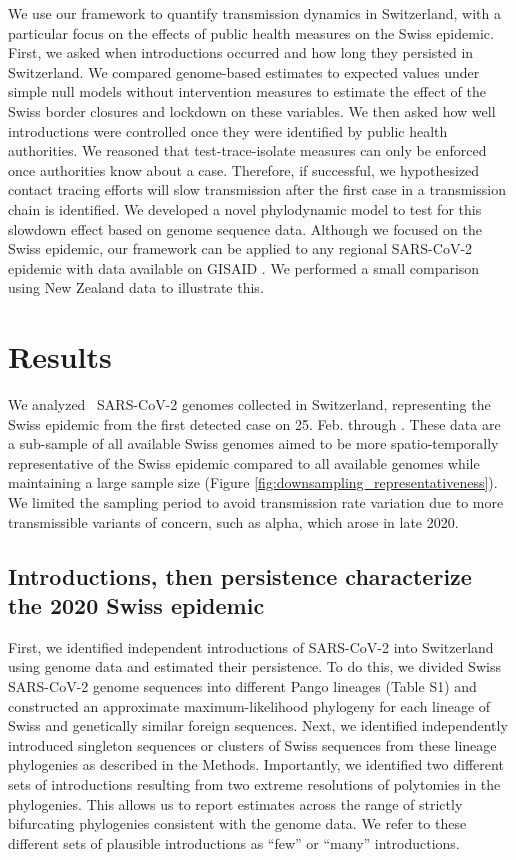 \documentclass[11pt,twoside,lineno]{pnas-new} %
\begin{document}
We use our framework to quantify transmission dynamics in Switzerland, with a particular focus on the effects of public health measures on the Swiss epidemic. First, we asked when introductions occurred and how long they persisted in Switzerland. We compared genome-based estimates to expected values under simple null models without intervention measures to estimate the effect of the Swiss border closures and lockdown on these variables. We then asked how well introductions were controlled once they were identified by public health authorities. We reasoned that test-trace-isolate measures can only be enforced once authorities know about a case. Therefore, if successful, we hypothesized contact tracing efforts will slow transmission after the first case in a transmission chain is identified. We developed a novel phylodynamic model to test for this slowdown effect based on genome sequence data. Although we focused on the Swiss epidemic, our framework can be applied to any regional SARS-CoV-2 epidemic with data available on GISAID \cite{GISAID}. We performed a small comparison using New Zealand data to illustrate this. 

\section{Results}
We analyzed \nfocalsamples\ SARS-CoV-2 genomes collected in Switzerland, representing the Swiss epidemic from the first detected case on 25. Feb. through \maxdate. These data are a sub-sample of all available Swiss genomes aimed to be more spatio-temporally representative of the Swiss epidemic compared to all available genomes while maintaining a large sample size (Figure  \ref{fig:downsampling_representativeness}). We limited the sampling period to avoid transmission rate variation due to more transmissible variants of concern, such as alpha, which arose in late 2020.

\subsection{Introductions, then persistence characterize the 2020 Swiss epidemic}

First, we identified independent introductions of SARS-CoV-2 into Switzerland using genome data and estimated their persistence. To do this, we divided Swiss SARS-CoV-2 genome sequences into different Pango lineages (Table S1) and constructed an approximate maximum-likelihood phylogeny for each lineage of Swiss and genetically similar foreign sequences. Next, we identified independently introduced singleton sequences or clusters of Swiss sequences from these lineage phylogenies as described in the Methods. Importantly, we identified two different sets of introductions resulting from two extreme resolutions of polytomies in the phylogenies. This allows us to report estimates across the range of strictly bifurcating phylogenies consistent with the genome data. We refer to these different sets of plausible introductions as ``few'' or ``many'' introductions.
\end{document}
